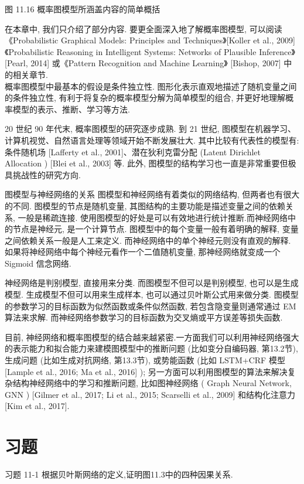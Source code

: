 \documentclass[10pt]{article}
\begin{document}
图 11.16 概率图模型所涵盖内容的简单概括

在本章中, 我们只介绍了部分内容. 要更全面深入地了解概率图模型, 可以阅读《Probabilistic Graphical Models: Principles and Techniques》[Koller et al., 2009] 《Probabilistic Reasoning in Intelligent Systems: Networks of Plausible Inference》[Pearl, 2014] 或《Pattern Recognition and Machine Learning》 [Bishop, 2007] 中的相关章节.\\
概率图模型中最基本的假设是条件独立性. 图形化表示直观地描述了随机变量之间的条件独立性, 有利于将复杂的概率模型分解为简单模型的组合, 并更好地理解概率模型的表示、推断、学习等方法.

20 世纪 90 年代末, 概率图模型的研究逐步成熟. 到 21 世纪, 图模型在机器学习、计算机视觉、自然语言处理等领域开始不断发展壮大. 其中比较有代表性的模型有: 条件随机场 [Lafferty et al., 2001]、潜在狄利克雷分配 (Latent Dirichlet Allocation ) [Blei et al., 2003] 等. 此外, 图模型的结构学习也一直是非常重要但极具挑战性的研究方向.

图模型与神经网络的关系 图模型和神经网络有着类似的网络结构, 但两者也有很大的不同. 图模型的节点是随机变量, 其图结构的主要功能是描述变量之间的依赖关系, 一般是稀疏连接. 使用图模型的好处是可以有效地进行统计推断.而神经网络中的节点是神经元, 是一个计算节点. 图模型中的每个变量一般有着明确的解释, 变量之间依赖关系一般是人工来定义. 而神经网络中的单个神经元则没有直观的解释. 如果将神经网络中每个神经元看作一个二值随机变量, 那神经网络就变成一个Sigmoid 信念网络.

神经网络是判别模型, 直接用来分类. 而图模型不但可以是判别模型, 也可以是生成模型. 生成模型不但可以用来生成样本, 也可以通过贝叶斯公式用来做分类. 图模型的参数学习的目标函数为似然函数或条件似然函数, 若包含隐变量则通常通过 EM 算法来求解. 而神经网络参数学习的目标函数为交叉熵或平方误差等损失函数.

目前, 神经网络和概率图模型的结合越来越紧密.一方面我们可以利用神经网络强大的表示能力和拟合能力来建模图模型中的推断问题 (比如变分自编码器, 第13.2节), 生成问题 (比如生成对抗网络, 第13.3节), 或势能函数 (比如 LSTM+CRF 模型 [Lample et al., 2016; Ma et al., 2016] ); 另一方面可以利用图模型的算法来解决复杂结构神经网络中的学习和推断问题, 比如图神经网络 ( Graph Neural Network, GNN ) [Gilmer et al., 2017; Li et al., 2015; Scarselli et al., 2009] 和结构化注意力 [Kim et al., 2017].

\section*{习题}
习题 11-1 根据贝叶斯网络的定义,证明图11.3中的四种因果关系.
\end{document}
